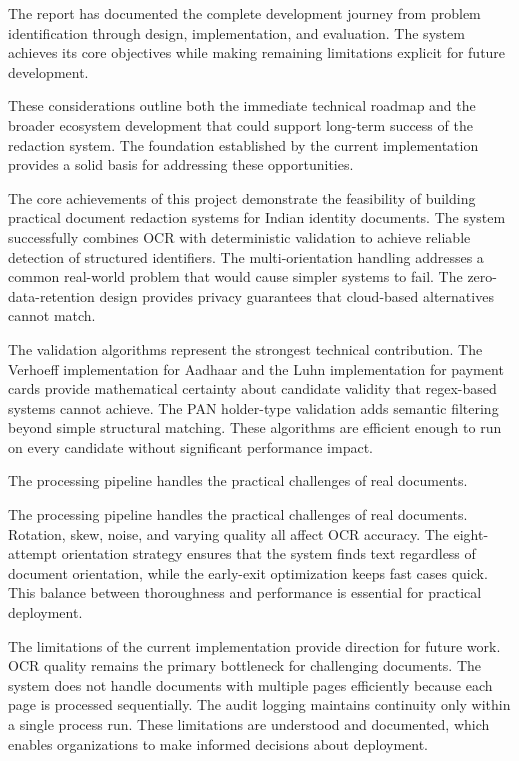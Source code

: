 \bigskip

The report has documented the complete development journey from problem identification through design, implementation, and evaluation. The system achieves its core objectives while making remaining limitations explicit for future development.

\bigskip

These considerations outline both the immediate technical roadmap and the broader ecosystem development that could support long-term success of the redaction system. The foundation established by the current implementation provides a solid basis for addressing these opportunities.

\bigskip

The core achievements of this project demonstrate the feasibility of building practical document redaction systems for Indian identity documents. The system successfully combines OCR with deterministic validation to achieve reliable detection of structured identifiers. The multi-orientation handling addresses a common real-world problem that would cause simpler systems to fail. The zero-data-retention design provides privacy guarantees that cloud-based alternatives cannot match.

\bigskip

The validation algorithms represent the strongest technical contribution. The Verhoeff implementation for Aadhaar and the Luhn implementation for payment cards provide mathematical certainty about candidate validity that regex-based systems cannot achieve. The PAN holder-type validation adds semantic filtering beyond simple structural matching. These algorithms are efficient enough to run on every candidate without significant performance impact.

\bigskip

The processing pipeline handles the practical challenges of real documents.

The processing pipeline handles the practical challenges of real documents. Rotation, skew, noise, and varying quality all affect OCR accuracy. The eight-attempt orientation strategy ensures that the system finds text regardless of document orientation, while the early-exit optimization keeps fast cases quick. This balance between thoroughness and performance is essential for practical deployment.

\bigskip

The limitations of the current implementation provide direction for future work. OCR quality remains the primary bottleneck for challenging documents. The system does not handle documents with multiple pages efficiently because each page is processed sequentially. The audit logging maintains continuity only within a single process run. These limitations are understood and documented, which enables organizations to make informed decisions about deployment.


